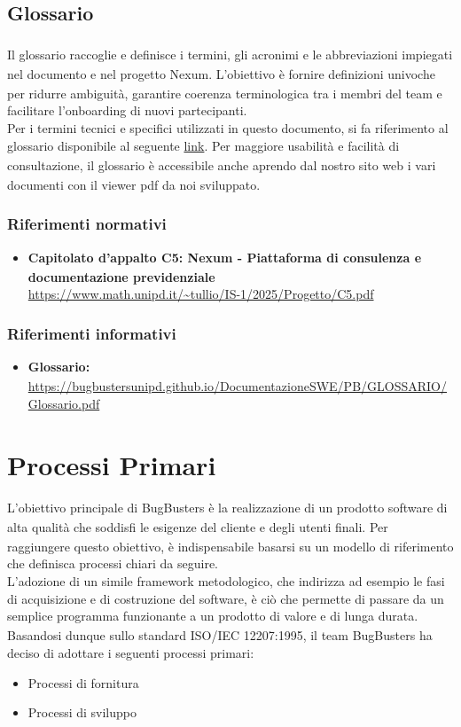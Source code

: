 \documentclass[a4paper,11pt]{article}
\newcommand{\G}{\textsubscript{\scalebox{0.6}{\textbf{G}}}}
\begin{document}
\subsection{Glossario\G{}}
Il glossario\G{} raccoglie e definisce i termini, gli acronimi e le abbreviazioni 
impiegati nel documento e nel progetto\G{} Nexum. L'obiettivo è fornire definizioni univoche per ridurre 
ambiguità, garantire coerenza terminologica tra i membri del team e facilitare l'onboarding di nuovi partecipanti. \\
Per i termini tecnici e specifici utilizzati in questo documento, si fa riferimento al glossario\G{} disponibile al 
seguente \href{https://bugbustersunipd.github.io/DocumentazioneSWE/PB/GLOSSARIO/Glossario.pdf}{link}.
Per maggiore usabilità e facilità di consultazione, il glossario\G{} è accessibile anche aprendo dal nostro sito web i vari documenti con il viewer
pdf da noi sviluppato.

\subsubsection{Riferimenti normativi}
\begin{itemize}
\item \textbf{Capitolato\G{}
 d'appalto C5: Nexum - Piattaforma di consulenza e documentazione previdenziale}\\
\url{https://www.math.unipd.it/~tullio/IS-1/2025/Progetto/C5.pdf}
\end{itemize}

\subsubsection{Riferimenti informativi}
\begin{itemize}
    \item \textbf{Glossario\G{}:}\\
\url{https://bugbustersunipd.github.io/DocumentazioneSWE/PB/GLOSSARIO/Glossario.pdf}
\end{itemize}

\newpage

\section{Processi Primari}
L'obiettivo principale di BugBusters è la realizzazione di un prodotto\G{} software di alta qualità\G{} che soddisfi 
le esigenze del cliente e degli utenti finali. Per raggiungere questo obiettivo, è indispensabile basarsi 
su un modello di riferimento che definisca processi chiari da seguire. \\
L'adozione di un simile framework metodologico, che indirizza ad esempio le fasi di acquisizione e di costruzione 
del software, è ciò che permette di passare da un semplice programma funzionante a un prodotto\G{} di valore e di 
lunga durata.
Basandosi dunque sullo standard ISO/IEC 12207:1995, il team BugBusters ha deciso di adottare i seguenti processi 
primari:
\begin{itemize}
    \item Processi di fornitura
    \item Processi di sviluppo
\end{itemize}
\end{document}
